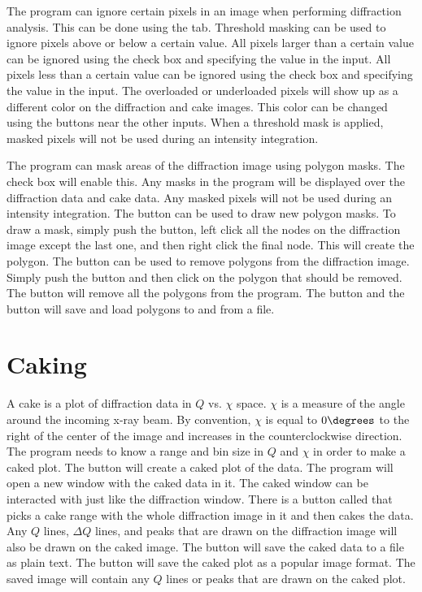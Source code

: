 The program can ignore certain pixels in an image
when performing diffraction analysis. This can be done
using the  tab.  Threshold masking can be 
used to ignore pixels above or below a certain value.
All pixels larger than a certain value can be ignored 
using the  check box
and specifying the value in the 
 input.
All pixels less than a certain value can be ignored 
using the  check box 
and specifying the value in the 
 input.
The overloaded or underloaded pixels will show up
as a different color on the diffraction and cake images.
This color can be changed using the  buttons
near the other inputs.
When a threshold mask is applied, masked pixels
will not be used during an intensity integration.

The program can mask areas of the diffraction image
using polygon masks. The  check box 
will enable this. Any masks in the program
will be displayed over the diffraction data and cake data.
Any masked pixels will not be used during an intensity
integration. The  button can be used to 
draw new polygon masks. To draw a mask, simply push
the button, left click all the
nodes on the diffraction image except the last one, and
then right click the final node. This will create the 
polygon. The  button can be used to 
remove polygons from the diffraction image. Simply push
the button and then click on the polygon that should be
removed. The  button will remove all
the polygons from the program. The  button
and the  button will save and load
polygons to and from a file.

\section{Caking}
\index{$\chi$}

A cake is a plot of diffraction data in $Q$ vs.
$\chi$ space. $\chi$ is a measure of the angle around 
the incoming x-ray beam. By convention, $\chi$ is equal to 
$0\degrees$ to the right of the center of the image and
increases in the counterclockwise direction. 
The program needs to know a range and bin size in $Q$ and
$\chi$ in order to make a caked plot. The  button
will create a caked plot of the data. The 
program will open a new window with the caked data in
it. The caked window can be interacted with just like
the diffraction window. There is a button called  that 
picks a cake range with the whole diffraction image in it 
and then cakes the data. Any $Q$ lines, $\Delta Q$ lines,
and peaks that are drawn on the diffraction image
will also be drawn on the caked image.
The  button will save the caked data
to a file as plain text. The  button will save the
caked plot as a popular image format.
The saved image will contain any $Q$ lines or peaks that are drawn on 
the caked plot.

